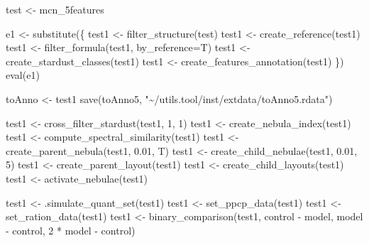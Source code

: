 \documentclass[
]{article}
\newenvironment{Shaded}{\begin{snugshade}}{\end{snugshade}}
\newcommand{\AttributeTok}[1]{\textcolor[rgb]{0.77,0.63,0.00}{#1}}
\newcommand{\DecValTok}[1]{\textcolor[rgb]{0.00,0.00,0.81}{#1}}
\newcommand{\FloatTok}[1]{\textcolor[rgb]{0.00,0.00,0.81}{#1}}
\newcommand{\FunctionTok}[1]{\textcolor[rgb]{0.00,0.00,0.00}{#1}}
\newcommand{\NormalTok}[1]{#1}
\newcommand{\OtherTok}[1]{\textcolor[rgb]{0.56,0.35,0.01}{#1}}
\newcommand{\SpecialCharTok}[1]{\textcolor[rgb]{0.00,0.00,0.00}{#1}}
\newcommand{\StringTok}[1]{\textcolor[rgb]{0.31,0.60,0.02}{#1}}
\begin{document}
\begin{Shaded}
\begin{Highlighting}[]
\NormalTok{test }\OtherTok{\textless{}{-}}\NormalTok{ mcn\_5features}

\NormalTok{e1 }\OtherTok{\textless{}{-}} \FunctionTok{substitute}\NormalTok{(\{}
\NormalTok{  test1 }\OtherTok{\textless{}{-}} \FunctionTok{filter\_structure}\NormalTok{(test)}
\NormalTok{  test1 }\OtherTok{\textless{}{-}} \FunctionTok{create\_reference}\NormalTok{(test1)}
\NormalTok{  test1 }\OtherTok{\textless{}{-}} \FunctionTok{filter\_formula}\NormalTok{(test1, }\AttributeTok{by\_reference=}\NormalTok{T)}
\NormalTok{  test1 }\OtherTok{\textless{}{-}} \FunctionTok{create\_stardust\_classes}\NormalTok{(test1)}
\NormalTok{  test1 }\OtherTok{\textless{}{-}} \FunctionTok{create\_features\_annotation}\NormalTok{(test1)}
\NormalTok{\})}
\FunctionTok{eval}\NormalTok{(e1)}

\NormalTok{toAnno }\OtherTok{\textless{}{-}}\NormalTok{ test1}
\FunctionTok{save}\NormalTok{(toAnno5, }\StringTok{"\textasciitilde{}/utils.tool/inst/extdata/toAnno5.rdata"}\NormalTok{)}

\NormalTok{test1 }\OtherTok{\textless{}{-}} \FunctionTok{cross\_filter\_stardust}\NormalTok{(test1, }\DecValTok{1}\NormalTok{, }\DecValTok{1}\NormalTok{)}
\NormalTok{test1 }\OtherTok{\textless{}{-}} \FunctionTok{create\_nebula\_index}\NormalTok{(test1)}
\NormalTok{test1 }\OtherTok{\textless{}{-}} \FunctionTok{compute\_spectral\_similarity}\NormalTok{(test1)}
\NormalTok{test1 }\OtherTok{\textless{}{-}} \FunctionTok{create\_parent\_nebula}\NormalTok{(test1, }\FloatTok{0.01}\NormalTok{, T)}
\NormalTok{test1 }\OtherTok{\textless{}{-}} \FunctionTok{create\_child\_nebulae}\NormalTok{(test1, }\FloatTok{0.01}\NormalTok{, }\DecValTok{5}\NormalTok{)}
\NormalTok{test1 }\OtherTok{\textless{}{-}} \FunctionTok{create\_parent\_layout}\NormalTok{(test1)}
\NormalTok{test1 }\OtherTok{\textless{}{-}} \FunctionTok{create\_child\_layouts}\NormalTok{(test1)}
\NormalTok{test1 }\OtherTok{\textless{}{-}} \FunctionTok{activate\_nebulae}\NormalTok{(test1)}

\NormalTok{test1 }\OtherTok{\textless{}{-}} \FunctionTok{.simulate\_quant\_set}\NormalTok{(test1)}
\NormalTok{test1 }\OtherTok{\textless{}{-}} \FunctionTok{set\_ppcp\_data}\NormalTok{(test1)}
\NormalTok{test1 }\OtherTok{\textless{}{-}} \FunctionTok{set\_ration\_data}\NormalTok{(test1)}
\NormalTok{test1 }\OtherTok{\textless{}{-}} \FunctionTok{binary\_comparison}\NormalTok{(test1, control }\SpecialCharTok{{-}}\NormalTok{ model,}
\NormalTok{                           model }\SpecialCharTok{{-}}\NormalTok{ control, }\DecValTok{2} \SpecialCharTok{*}\NormalTok{ model }\SpecialCharTok{{-}}\NormalTok{ control)}


\end{Highlighting}
\end{Shaded}
\end{document}
